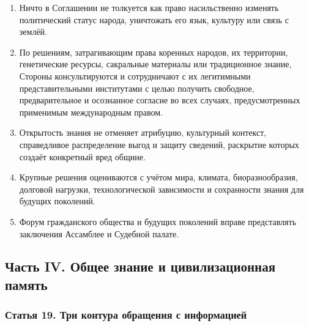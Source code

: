 \documentclass[
  russian,
  11pt,
  a4paper,
]{article}
\providecommand{\tightlist}{%
  \setlength{\itemsep}{0pt}\setlength{\parskip}{0pt}}
\begin{document}
\begin{enumerate}
\def\labelenumi{\arabic{enumi}.}
\tightlist
\item
  Ничто в Соглашении не толкуется как право насильственно изменять
  политический статус народа, уничтожать его язык, культуру или связь с
  землёй.
\item
  По решениям, затрагивающим права коренных народов, их территории,
  генетические ресурсы, сакральные материалы или традиционное знание,
  Стороны консультируются и сотрудничают с их легитимными
  представительными институтами с целью получить свободное,
  предварительное и осознанное согласие во всех случаях, предусмотренных
  применимым международным правом.
\item
  Открытость знания не отменяет атрибуцию, культурный контекст,
  справедливое распределение выгод и защиту сведений, раскрытие которых
  создаёт конкретный вред общине.
\item
  Крупные решения оцениваются с учётом мира, климата, биоразнообразия,
  долговой нагрузки, технологической зависимости и сохранности знания
  для будущих поколений.
\item
  Форум гражданского общества и будущих поколений вправе представлять
  заключения Ассамблее и Судебной палате.
\end{enumerate}

\subsection{Часть IV. Общее знание и цивилизационная
память}\label{ux447ux430ux441ux442ux44c-iv-ux43eux431ux449ux435ux435-ux437ux43dux430ux43dux438ux435-ux438-ux446ux438ux432ux438ux43bux438ux437ux430ux446ux438ux43eux43dux43dux430ux44f-ux43fux430ux43cux44fux442ux44c}

\subsubsection{Статья 19. Три контура обращения с
информацией}\label{ux441ux442ux430ux442ux44cux44f-19-ux442ux440ux438-ux43aux43eux43dux442ux443ux440ux430-ux43eux431ux440ux430ux449ux435ux43dux438ux44f-ux441-ux438ux43dux444ux43eux440ux43cux430ux446ux438ux435ux439}
\end{document}
